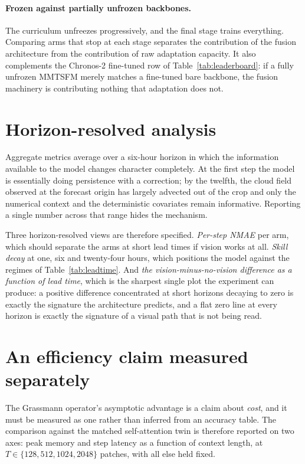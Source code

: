 \paragraph{Frozen against partially unfrozen backbones.} The curriculum unfreezes
progressively, and the final stage trains everything. Comparing arms that stop at each stage
separates the contribution of the fusion architecture from the contribution of raw adaptation
capacity. It also complements the Chronos-2 fine-tuned row of
Table~\ref{tab:leaderboard}: if a fully unfrozen MMTSFM merely matches a fine-tuned bare
backbone, the fusion machinery is contributing nothing that adaptation does not.

\section{Horizon-resolved analysis}
\label{sec:horizon-analysis}

Aggregate metrics average over a six-hour horizon in which the information available to the
model changes character completely. At the first step the model is essentially doing
persistence with a correction; by the twelfth, the cloud field observed at the forecast
origin has largely advected out of the crop and only the numerical context and the
deterministic covariates remain informative. Reporting a single number across that range
hides the mechanism.

Three horizon-resolved views are therefore specified. \emph{Per-step NMAE} per arm, which
should separate the arms at short lead times if vision works at all. \emph{Skill decay} at
one, six and twenty-four hours, which positions the model against the regimes of
Table~\ref{tab:leadtime}. And \emph{the vision-minus-no-vision difference as a function of
lead time}, which is the sharpest single plot the experiment can produce: a positive
difference concentrated at short horizons decaying to zero is exactly the signature the
architecture predicts, and a flat zero line at every horizon is exactly the signature of a
visual path that is not being read.

\section{An efficiency claim measured separately}
\label{sec:efficiency}

The Grassmann operator's asymptotic advantage is a claim about \emph{cost}, and it must be
measured as one rather than inferred from an accuracy table. The comparison against the
matched self-attention twin is therefore reported on two axes: peak memory and step latency
as a function of context length, at $T \in \{128, 512, 1024, 2048\}$ patches, with all else
held fixed.

